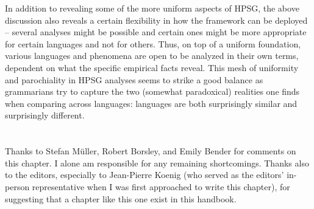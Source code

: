 \documentclass[output=paper
 	        ,biblatex
                ,babelshorthands
                ,newtxmath
                ,draftmode
                ,colorlinks, citecolor=brown
]{langscibook}
\begin{document}
In addition to revealing some of the more uniform aspects of HPSG, the above discussion also reveals a certain flexibility in how the framework can be deployed -- several analyses might be possible and certain ones might be more appropriate for certain languages and not for others. Thus, on top of a uniform foundation, various languages and phenomena are open to be analyzed in their own terms, dependent on what the specific empirical facts reveal. This mesh of uniformity and parochiality in HPSG analyses seems to strike a good balance as grammarians try to capture the two (somewhat paradoxical) realities one finds when comparing across languages: languages are both surprisingly similar and surprisingly different.                 

\section*{\acknowledgmentsUS}

Thanks to Stefan Müller, Robert Borsley, and Emily Bender for comments on this chapter. I alone am responsible for any remaining shortcomings. Thanks also to the editors, especially to Jean-Pierre Koenig (who served as the editors' in-person representative when I was first approached to write this chapter), for suggesting that a chapter like this one exist in this handbook.  


{\sloppy

\printbibliography[heading=subbibliography,notkeyword=this]
}
\end{document}

